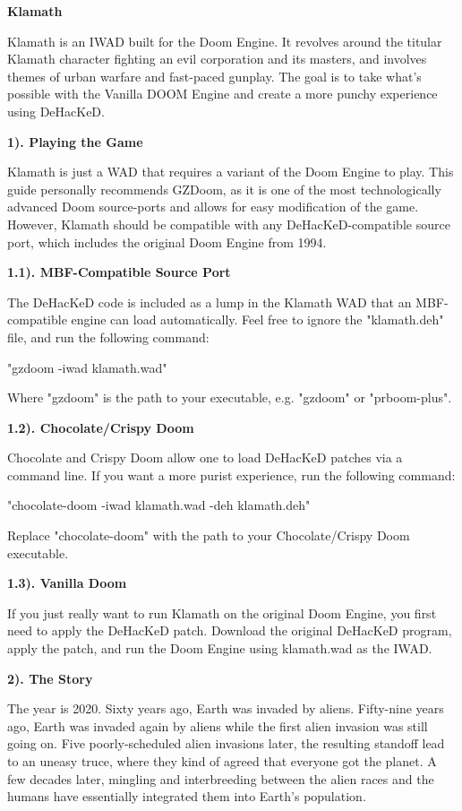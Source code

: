 \documentclass[12pt]{article}
\begin{document}
\begin{flushleft}
\begin{center}
\textbf{Klamath}
\end{center}

\setlength{\parindent}{0.5in}

Klamath is an IWAD built for the Doom Engine. It revolves around the titular Klamath character fighting an evil corporation and its masters, and involves themes of urban warfare and fast-paced gunplay.  The goal is to take what's possible with the Vanilla DOOM Engine and create a more punchy experience using DeHacKeD.

\textbf{1). Playing the Game}

Klamath is just a WAD that requires a variant of the Doom Engine to play. This guide personally recommends GZDoom, as it is one of the most technologically advanced Doom source-ports and allows for easy modification of the game. However, Klamath should be compatible with any DeHacKeD-compatible source port, which includes the original Doom Engine from 1994.

\textbf{1.1). MBF-Compatible Source Port}

The DeHacKeD code is included as a lump in the Klamath WAD that an MBF-compatible engine can load automatically. Feel free to ignore the "klamath.deh" file, and run the following command:

"gzdoom -iwad klamath.wad"

Where "gzdoom" is the path to your executable, e.g. "gzdoom" or "prboom-plus".

\textbf{1.2). Chocolate/Crispy Doom}

Chocolate and Crispy Doom allow one to load DeHacKeD patches via a command line. If you want a more purist experience, run the following command:

"chocolate-doom -iwad klamath.wad -deh klamath.deh"

Replace "chocolate-doom" with the path to your Chocolate/Crispy Doom executable.

\textbf{1.3). Vanilla Doom}

If you just really want to run Klamath on the original Doom Engine, you first need to apply the DeHacKeD patch. Download the original DeHacKeD program, apply the patch, and run the Doom Engine using klamath.wad as the IWAD.

\textbf{2). The Story}

The year is 2020. Sixty years ago, Earth was invaded by aliens. Fifty-nine years ago, Earth was invaded again by aliens while the first alien invasion was still going on. Five poorly-scheduled alien invasions later, the resulting standoff lead to an uneasy truce, where they kind of agreed that everyone got the planet. A few decades later, mingling and interbreeding between the alien races and the humans have essentially integrated them into Earth's population.


\end{flushleft}
\end{document}
